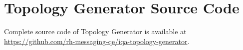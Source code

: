\section{Topology Generator Source Code}
\label{AP:Topology Generator Source Code}
Complete source code of Topology Generator is available at \url{https://github.com/rh-messaging-qe/iqa-topology-generator}.


